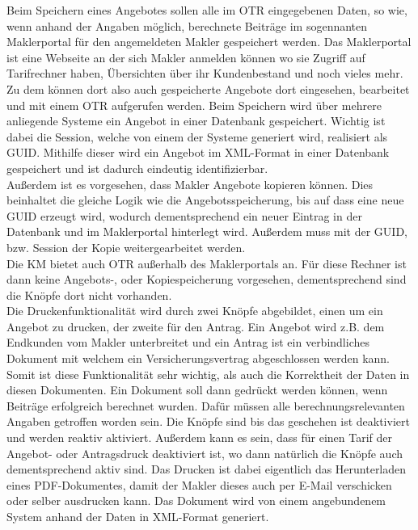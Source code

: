 Beim Speichern eines Angebotes sollen alle im \ac{OTR} eingegebenen Daten, so wie, wenn anhand der Angaben möglich, berechnete Beiträge im sogennanten Maklerportal für den angemeldeten Makler gespeichert werden. Das Maklerportal ist eine Webseite an der sich Makler anmelden können wo sie Zugriff auf Tarifrechner haben, Übersichten über ihr Kundenbestand und noch vieles mehr. Zu dem können dort also auch gespeicherte Angebote dort eingesehen, bearbeitet und mit einem \ac{OTR} aufgerufen werden. Beim Speichern wird über mehrere anliegende Systeme ein Angebot in einer Datenbank gespeichert. Wichtig ist dabei die Session, welche von einem der Systeme generiert wird, realisiert als \ac{GUID}. Mithilfe dieser wird ein Angebot im XML-Format in einer Datenbank gespeichert und ist dadurch eindeutig identifizierbar.\\
Außerdem ist es vorgesehen, dass Makler Angebote kopieren können. Dies beinhaltet die gleiche Logik wie die Angebotsspeicherung, bis auf dass eine neue \ac{GUID} erzeugt wird, wodurch dementsprechend ein neuer Eintrag in der Datenbank und im Maklerportal hinterlegt wird. Außerdem muss mit der \ac{GUID}, bzw. Session der Kopie weitergearbeitet werden.\\
Die \ac{KM} bietet auch \ac{OTR} außerhalb des Maklerportals an. Für diese Rechner ist dann keine Angebots-, oder Kopiespeicherung vorgesehen, dementsprechend sind die Knöpfe dort nicht vorhanden. \\

Die Druckenfunktionalität wird durch zwei Knöpfe abgebildet, einen um ein Angebot zu drucken, der zweite für den Antrag. Ein Angebot wird z.B. dem Endkunden vom Makler unterbreitet und ein Antrag ist ein verbindliches Dokument mit welchem ein Versicherungsvertrag abgeschlossen werden kann. Somit ist diese Funktionalität sehr wichtig, als auch die Korrektheit der Daten in diesen Dokumenten. Ein Dokument soll dann gedrückt werden können, wenn Beiträge erfolgreich berechnet wurden. Dafür müssen alle berechnungsrelevanten Angaben getroffen worden sein. Die Knöpfe sind bis das geschehen ist deaktiviert und werden reaktiv aktiviert. Außerdem kann es sein, dass für einen Tarif der Angebot- oder Antragsdruck deaktiviert ist, wo dann natürlich die Knöpfe auch dementsprechend aktiv sind. Das Drucken ist dabei eigentlich das Herunterladen eines PDF-Dokumentes, damit der Makler dieses auch per E-Mail verschicken oder selber ausdrucken kann. Das Dokument wird von einem angebundenem System anhand der Daten in XML-Format generiert.

